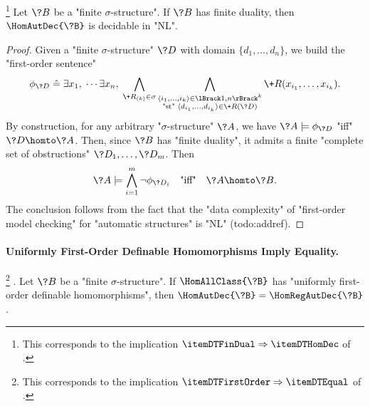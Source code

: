 \begin{proposition}
	\!\footnote{This corresponds to the implication $\itemDTFinDual \Rightarrow \itemDTHomDec$
	of .}
	\AP\label{prop:dichotomy-FinDual-implies-HomDec}
	Let $\?B$ be a "finite $\sigma$-structure".
	If $\?B$ has finite duality, then $\HomAutDec{\?B}$ is decidable in "NL".
\end{proposition}

\begin{proof}
	Given a "finite $\sigma$-structure" $\?D$ with domain $\{d_1,\hdots,d_n\}$,
	we build the "first-order sentence"
	\[
		\phi_{\?D} \defeq \exists x_1,\; \cdots \exists x_n,\;
		\bigwedge_{\+R_{(k)} \in \sigma} \bigwedge_{\substack{\tup{i_1,\hdots,i_k} \in \lBrack 1,n\rBrack^k\\\text{"st" }\tup{d_{i_1},\hdots,d_{i_k}} \in \+R(\?D)}}
		\+R(x_{i_1},\hdots,x_{i_k}).
	\]
	By construction, for any arbitrary "$\sigma$-structure" $\?A$, we have $\?A \models \phi_{\?D}$
	"iff" $\?D \homto \?A$.
	Then, since $\?B$ has "finite duality", it admits a finite "complete set of obstructions" $\?D_1,\hdots,\?D_m$.
	Then
	\[
		\?A \models \bigwedge_{i=1}^m \neg \phi_{\?D_i}
		\quad\text{"iff"}\quad 
		\?A \homto \?B.
	\]
	The conclusion follows from the fact that the "data complexity"
	of "first-order model checking" for
	"automatic structures" is "NL" (todo:addref).
\end{proof}

\paragraph*{Uniformly First-Order Definable Homomorphisms Imply Equality.}

\begin{proposition}
	\!\footnote{This corresponds to the implication $\itemDTFirstOrder \Rightarrow \itemDTEqual$
	of .}
	\AP\label{prop:dichotomy-FirstOrder-implies-Equal}.
	Let $\?B$ be a "finite $\sigma$-structure".
	If $\HomAllClass{\?B}$ has "uniformly first-order definable homomorphisms", then
	$\HomAutDec{\?B} = \HomRegAutDec{\?B}$.
\end{proposition}

